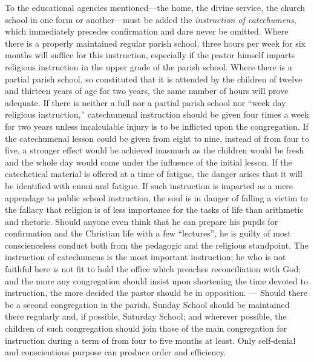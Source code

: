 To the educational agencies mentioned—the home, the divine service, the church school in one form or another—must be added the \emph{instruction of catechumens}, which immediately precedes confirmation and dare never be omitted. Where there is a properly maintained regular parish school, three hours per week for six months will suffice for this instruction, especially if the pastor himself imparts religious instruction in the upper grade of the parish school. Where there is a partial parish school, so constituted that it is attended by the children of twelve and thirteen years of age for two years, the same number of hours will prove adequate. If there is neither a full nor a partial parish school nor “week day religious instruction,” catechumenal instruction should be given four times a week for two years unless incalculable injury is to be inflicted upon the congregation. If the catechumenal lesson could be given from eight to nine, instead of from four to five, a stronger effect would be achieved inasmuch as the children would be fresh and the whole day would come under the influence of the initial lesson. If the catechetical material is offered at a time of fatigue, the danger arises that it will be identified with ennui and fatigue. If such instruction is imparted as a mere appendage to public school instruction, the soul is in danger of falling a victim to the fallacy that religion is of less importance for the tasks of life than arithmetic and rhetoric. Should anyone
even think that he can prepare his pupils for confirmation and the Christian life with a few “lectures”, he is guilty of most conscienceless conduct both from the pedagogic and the religious standpoint. The instruction of catechumens is the most important instruction; he who is not faithful here is not fit to hold the office which preaches reconciliation with God; and the more any congregation should insist upon shortening the time devoted to instruction, the more decided the pastor should be in opposition. — Should there be a second congregation in the parish, Sunday School should be maintained there regularly and, if possible, Saturday School; and wherever possible, the children of such congregation should join those of the main congregation for instruction during a term of from four to five months at least. Only self-denial and conscientious purpose can produce order and efficiency.

